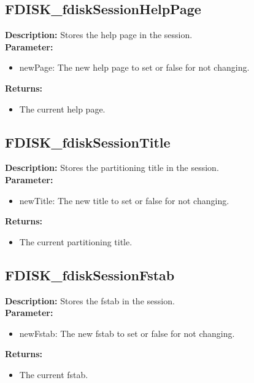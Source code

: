 \subsection{FDISK\_fdiskSessionHelpPage}
\textbf{Description:} Stores the help page in the session.\\
\textbf{Parameter:}
\begin{itemize}
\item newPage: The new help page to set or false for not changing.
\end{itemize}
\textbf{Returns:}
\begin{itemize}
\item The current help page.
\end{itemize}

\subsection{FDISK\_fdiskSessionTitle}
\textbf{Description:} Stores the partitioning title in the session.\\
\textbf{Parameter:}
\begin{itemize}
\item newTitle: The new title to set or false for not changing.
\end{itemize}
\textbf{Returns:}
\begin{itemize}
\item The current partitioning title.
\end{itemize}

\subsection{FDISK\_fdiskSessionFstab}
\textbf{Description:} Stores the fstab in the session.\\
\textbf{Parameter:}
\begin{itemize}
\item newFstab: The new fstab to set or false for not changing.
\end{itemize}
\textbf{Returns:}
\begin{itemize}
\item The current fstab.
\end{itemize}

